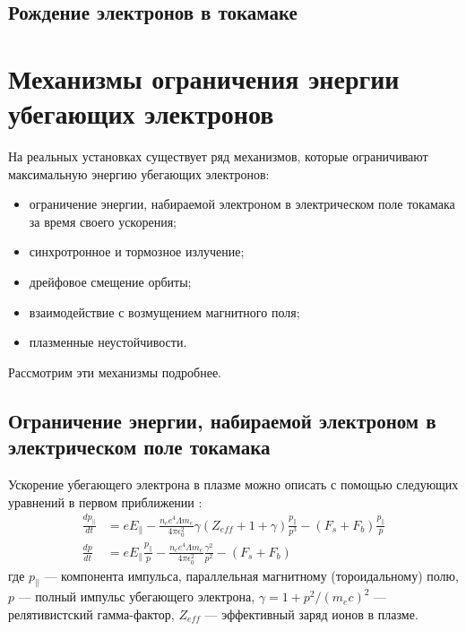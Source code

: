 
\subsection{Рождение электронов в токамаке}




\section{Механизмы ограничения энергии убегающих электронов}

На реальных установках существует ряд механизмов, которые ограничивают максимальную энергию убегающих электронов: 

\begin{itemize}
  \item ограничение энергии, набираемой электроном в электрическом поле токамака за время своего ускорения;
  \item синхротронное и тормозное излучение;
  \item дрейфовое смещение орбиты;
  \item взаимодействие с возмущением магнитного поля;
  \item плазменные неустойчивости.
\end{itemize}

Рассмотрим эти механизмы подробнее.


\subsection{Ограничение энергии, набираемой электроном в электрическом поле токамака}

Ускорение убегающего электрона в плазме можно описать с помощью следующих уравнений в первом приближении \cite{MartinSolis1998,Bakhtiari2005}:
\begin{equation}
  \label{eq:AccelerationRunaways}
  \begin{alignedat}{1}
    \frac{ d p_{\parallel} }{ d t } & = e E_{\parallel} - \frac{ n_c e^4 \Lambda m_e }{ 4 \pi \epsilon_0^2 } \gamma ( Z_{eff} + 1 + \gamma ) \frac{ p_{\parallel} }{ p^3 } - ( F_s + F_b ) \frac{ p_{\parallel} }{ p }   \\
    \frac{ d p }{ d t } & = e E_{\parallel} \frac{ p_{\parallel} }{ p } - \frac{ n_c e^4 \Lambda m_e }{ 4 \pi \epsilon_0^2 } \frac{ \gamma^2 }{ p^2 } - ( F_s + F_b )
  \end{alignedat}  
\end{equation}
где $ p_{\parallel} $ --- компонента импульса, параллельная магнитному (тороидальному) полю, $p$ --- полный импульс убегающего электрона, $\gamma = 1 + p^2 / ( m_e c )^2$ --- релятивистский гамма-фактор, $Z_{eff}$ --- эффективный заряд ионов в плазме. 

